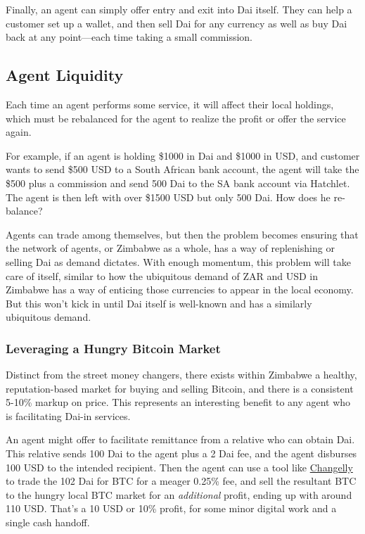 \documentclass{article}
\begin{document}
Finally, an agent can simply offer entry and exit into Dai itself. They can help a customer set up a wallet, and then sell Dai for any currency as well as buy Dai back at any point---each time taking a small commission.

\subsection{Agent Liquidity} \label{liquidity}

Each time an agent performs some service, it will affect their local holdings, which must be rebalanced for the agent to realize the profit or offer the service again.

For example, if an agent is holding \$1000 in Dai and \$1000 in USD, and customer wants to send \$500 USD to a South African bank account, the agent will take the \$500 plus a commission and send 500 Dai to the SA bank account via Hatchlet. The agent is then left with over \$1500 USD but only 500 Dai. How does he re-balance?

Agents can trade among themselves, but then the problem becomes ensuring that the network of agents, or Zimbabwe as a whole, has a way of replenishing or selling Dai as demand dictates. With enough momentum, this problem will take care of itself, similar to how the ubiquitous demand of ZAR and USD in Zimbabwe has a way of enticing those currencies to appear in the local economy. But this won't kick in until Dai itself is well-known and has a similarly ubiquitous demand.

\subsubsection{Leveraging a Hungry Bitcoin Market} \label{bitcoin liquidity}

Distinct from the street money changers, there exists within Zimbabwe a healthy, reputation-based market for buying and selling Bitcoin, and there is a consistent 5-10\% markup on price. This represents an interesting benefit to any agent who is facilitating Dai-in services.

An agent might offer to facilitate remittance from a relative who can obtain Dai. This relative sends 100 Dai to the agent plus a 2 Dai fee, and the agent disburses 100 USD to the intended recipient. Then the agent can use a tool like \href{https://changelly.com/}{Changelly} to trade the 102 Dai for BTC for a meager 0.25\% fee, and sell the resultant BTC to the hungry local BTC market for an \textit{additional} profit, ending up with around 110 USD. That's a 10 USD or 10\% profit, for some minor digital work and a single cash handoff.
\end{document}
